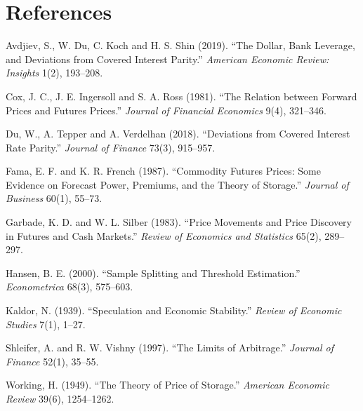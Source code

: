 \documentclass[11pt,a4paper]{article}
\begin{document}
\section*{References}
\small
\begin{list}{}{\setlength{\leftmargin}{1.6em}\setlength{\itemindent}{-1.6em}\setlength{\itemsep}{3pt}}
\item Avdjiev, S., W. Du, C. Koch and H. S. Shin (2019). ``The Dollar, Bank
Leverage, and Deviations from Covered Interest Parity.'' \emph{American
Economic Review: Insights} 1(2), 193--208.
\item Cox, J. C., J. E. Ingersoll and S. A. Ross (1981). ``The Relation between
Forward Prices and Futures Prices.'' \emph{Journal of Financial Economics}
9(4), 321--346.
\item Du, W., A. Tepper and A. Verdelhan (2018). ``Deviations from Covered
Interest Rate Parity.'' \emph{Journal of Finance} 73(3), 915--957.
\item Fama, E. F. and K. R. French (1987). ``Commodity Futures Prices: Some
Evidence on Forecast Power, Premiums, and the Theory of Storage.''
\emph{Journal of Business} 60(1), 55--73.
\item Garbade, K. D. and W. L. Silber (1983). ``Price Movements and Price
Discovery in Futures and Cash Markets.'' \emph{Review of Economics and
Statistics} 65(2), 289--297.
\item Hansen, B. E. (2000). ``Sample Splitting and Threshold Estimation.''
\emph{Econometrica} 68(3), 575--603.
\item Kaldor, N. (1939). ``Speculation and Economic Stability.'' \emph{Review of
Economic Studies} 7(1), 1--27.
\item Shleifer, A. and R. W. Vishny (1997). ``The Limits of Arbitrage.''
\emph{Journal of Finance} 52(1), 35--55.
\item Working, H. (1949). ``The Theory of Price of Storage.'' \emph{American
Economic Review} 39(6), 1254--1262.
\end{list}
\end{document}
